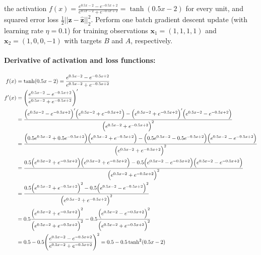 \documentclass[12pt]{article}
\begin{document}
\begin{enumerate}[leftmargin=\labelsep]
    the activation $f(x) = \frac{e^{0.5x-2}-e^{-0.5x+2}}{e^{0.5x-2}+e^{-0.5x+2}} = \tanh(0.5x-2)$ for every unit, and squared error loss $\frac{1}{2}||\mathbf{z}-\hat{\mathbf{z}}||^2_2$. Perform one batch gradient descent update (with learning rate $\eta = 0.1$) for training observations $\mathbf{x}_1 = (1, 1, 1, 1)$ and $\mathbf{x}_2 = (1, 0, 0, -1)$ with targets $B$ and $A$, respectively.
    
    \paragraph{Derivative of activation and loss functions:}
    \begin{equation}
    \begin{split}
        f(x) &= \tanh(0.5x-2) = \frac{e^{0.5x-2}-e^{-0.5x+2}}{e^{0.5x-2}+e^{-0.5x+2}} \\
        f'(x) &= \Biggl(\frac{e^{0.5x-2}-e^{-0.5x+2}}{e^{0.5x-2}+e^{-0.5x+2}} \Biggr)' \\
        &= \frac{\Bigl(e^{0.5x-2}-e^{-0.5x+2}\Bigr)'\Bigl(e^{0.5x-2}+e^{-0.5x+2}\Bigr)-\Bigl(e^{0.5x-2}+e^{-0.5x+2}\Bigr)'\Bigl(e^{0.5x-2}-e^{-0.5x+2}\Bigr)}{\Bigl(e^{0.5x-2}+e^{-0.5x+2}\Bigr)^2} \\
        &= \frac{\Bigl(0.5e^{0.5x-2}+0.5e^{-0.5x+2}\Bigr)\Bigl(e^{0.5x-2}+e^{-0.5x+2}\Bigr)-\Bigl(0.5e^{0.5x-2}-0.5e^{-0.5x+2}\Bigr)\Bigl(e^{0.5x-2}-e^{-0.5x+2}\Bigr)}{\Bigl(e^{0.5x-2}+e^{-0.5x+2}\Bigr)^2} \\
        &= \frac{0.5\Bigl(e^{0.5x-2}+e^{-0.5x+2}\Bigr)\Bigl(e^{0.5x-2}+e^{-0.5x+2}\Bigr)-0.5\Bigl(e^{0.5x-2}-e^{-0.5x+2}\Bigr)\Bigl(e^{0.5x-2}-e^{-0.5x+2}\Bigr)}{\Bigl(e^{0.5x-2}+e^{-0.5x+2}\Bigr)^2} \\
        &= \frac{0.5\Bigl(e^{0.5x-2}+e^{-0.5x+2}\Bigr)^2-0.5\Bigl(e^{0.5x-2}-e^{-0.5x+2}\Bigr)^2}{\Bigl(e^{0.5x-2}+e^{-0.5x+2}\Bigr)^2} \\
        &= 0.5\frac{\Bigl(e^{0.5x-2}+e^{-0.5x+2}\Bigr)^2}{\Bigl(e^{0.5x-2}+e^{-0.5x+2}\Bigr)^2} - 0.5\frac{\Bigl(e^{0.5x-2}-e^{-0.5x+2}\Bigr)^2}{\Bigl(e^{0.5x-2}+e^{-0.5x+2}\Bigr)^2}\\
        &= 0.5 - 0.5\Biggl(\frac{e^{0.5x-2}-e^{-0.5x+2}}{e^{0.5x-2}+e^{-0.5x+2}}\Biggr)^2 = 0.5 - 0.5\tanh^2(0.5x-2)
    \end{split}
    \end{equation}


\end{enumerate}
\end{document}
